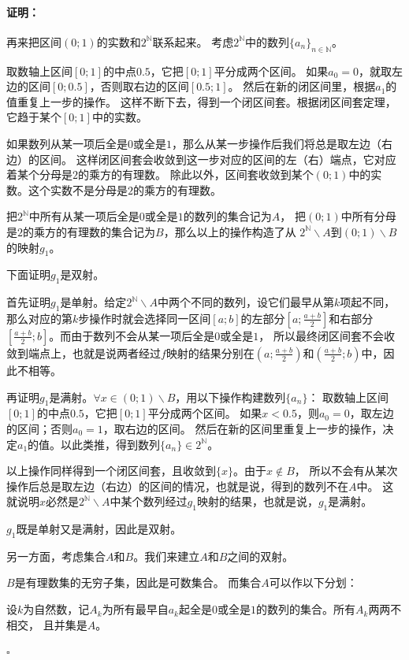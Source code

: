 \documentclass[12pt,UTF8]{ctexbook}
\theoremstyle{definition}
\theoremstyle{plain}
\renewenvironment{proof}{\paragraph{\textbf{证明：}}}{\hfill$\square$}
\begin{document}
\begin{appendix}
\begin{proof}
    再来把区间$(0;1)$的实数和$2^\mathbb{N}$联系起来。
    考虑$2^\mathbb{N}$中的数列$\{a_n\}_{n\in\mathbb{N}}$。

    取数轴上区间$[0;1]$的中点$0.5$，它把$[0;1]$平分成两个区间。
    如果$a_0 = 0$，就取左边的区间$[0;0.5]$，否则取右边的区间$[0.5;1]$。
    然后在新的闭区间里，根据$a_1$的值重复上一步的操作。
    这样不断下去，得到一个闭区间套。根据闭区间套定理，它趋于某个$[0;1]$中的实数。

    如果数列从某一项后全是$0$或全是$1$，那么从某一步操作后我们将总是取左边（右边）的区间。
    这样闭区间套会收敛到这一步对应的区间的左（右）端点，它对应着某个分母是$2$的乘方的有理数。
    除此以外，区间套收敛到某个$(0;1)$中的实数。这个实数不是分母是$2$的乘方的有理数。

    把$2^\mathbb{N}$中所有从某一项后全是$0$或全是$1$的数列的集合记为$A$，
    把$(0;1)$中所有分母是$2$的乘方的有理数的集合记为$B$，那么以上的操作构造了从
    $2^\mathbb{N}\backslash A$到$(0;1)\backslash B$的映射$g_1$。

    下面证明$g_1$是双射。

    首先证明$g_1$是单射。给定$2^\mathbb{N}\backslash A$中两个不同的数列，设它们最早从第$k$项起不同，
    那么对应的第$k$步操作时就会选择同一区间$[a; b]$的左部分$[a;\frac{a+b}{2}]$和右部分$[\frac{a+b}{2};b]$。而由于数列不会从某一项后全是$0$或全是$1$，
    所以最终闭区间套不会收敛到端点上，也就是说两者经过$f$映射的结果分别在$(a;\frac{a+b}{2})$和$(\frac{a+b}{2};b)$中，因此不相等。

    再证明$g_1$是满射。$\forall x \in (0;1)\backslash B$，用以下操作构建数列$\{a_n\}$：
    取数轴上区间$[0;1]$的中点$0.5$，它把$[0;1]$平分成两个区间。
    如果$x<0.5$，则$a_0=0$，取左边的区间；否则$a_0=1$，取右边的区间。
    然后在新的区间里重复上一步的操作，决定$a_1$的值。以此类推，得到数列$\{a_n\}\in 2^\mathbb{N}$。

    以上操作同样得到一个闭区间套，且收敛到$\{x\}$。由于$x\notin B$，
    所以不会有从某次操作后总是取左边（右边）的区间的情况，也就是说，得到的数列不在$A$中。
    这就说明$x$必然是$2^\mathbb{N}\backslash A$中某个数列经过$g_1$映射的结果，也就是说，$g_1$是满射。
    
    $g_1$既是单射又是满射，因此是双射。

    另一方面，考虑集合$A$和$B$。我们来建立$A$和$B$之间的双射。
    
    $B$是有理数集的无穷子集，因此是可数集合。
    而集合$A$可以作以下分划：

    设$k$为自然数，记$A_k$为所有最早自$a_k$起全是$0$或全是$1$的数列的集合。所有$A_k$两两不相交，
    且并集是$A$。


\end{proof}
\end{appendix}
\end{document}
